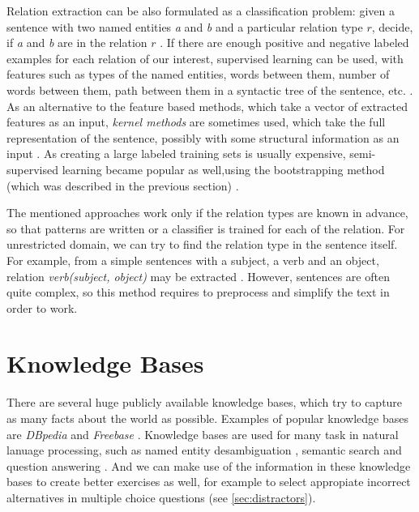 \documentclass[a4paper, 12pt, twoside]{fithesis2}		%
\renewcommand{\_}{\leavevmode \kern0.07em\vbox{\hrule width0.4em}}
\newcounter{choice}
\begin{document}

Relation extraction can be also formulated as a classification problem:
given a sentence with two named entities \emph{a} and \emph{b} and a particular relation type $r$,
decide, if \emph{a} and \emph{b} are in the relation $r$ \cite{rel-extract-review}.
If there are enough positive and negative labeled examples for each relation of our interest,
supervised learning can be used, with features such as
types of the named entities, words between them,
number of words between them, path between them in a syntactic tree of the sentence, etc.
\cite{rel-extract-feature-based}.
As an alternative to the feature based methods, which take a vector of extracted features as an input,
\emph{kernel methods} are sometimes used, which take the full representation of the sentence, possibly with some structural information as an input \cite{rel-extract-kernel}.
As creating a large labeled training sets is usually expensive, semi-supervised learning became popular as well,using the bootstrapping method (which was described in the previous section) \cite{rel-extract-bootstrapping}.

The mentioned approaches work only if the relation types are known in advance,
so that patterns are written or a classifier is trained for each of the relation.
For unrestricted domain,
we can try to find the relation type in the sentence itself.
For example, from a simple sentences with a subject, a verb and an object,
relation \emph{verb(subject, object)} may be extracted \cite{triples-acquisition}.
However, sentences are often quite complex, so this method requires to preprocess and simplify the text in order to work.

\section{Knowledge Bases}
\label{sec:knowledge-bases}

There are several huge publicly available knowledge bases,
which try to capture as many facts about the world as possible.
Examples of popular knowledge bases are
\textit{DBpedia} \cite{dbpedia}
and \textit{Freebase} \cite{freebase}.
Knowledge bases are used for many task in natural lanuage processing,
such as
named entity desambiguation \cite{dbpedia-spotlight},
semantic search and question answering \cite{watson}.
And we can make use of the information in these knowledge bases to create better exercises as well,
for example to select appropiate incorrect alternatives in multiple choice questions
(see \autoref{sec:distractors}).
\end{document}
